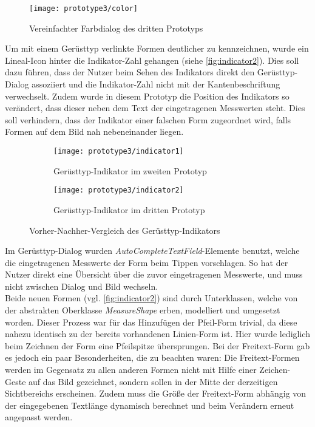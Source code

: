 \begin{figure}[h]
  \centering
  \texttt{[image: prototype3/color]}
  \caption{Vereinfachter Farbdialog des dritten Prototyps}
  \label{fig:color3}
\end{figure}

Um mit einem Gerüsttyp verlinkte Formen deutlicher zu kennzeichnen, wurde ein Lineal-Icon hinter die Indikator-Zahl gehangen (siehe \autoref{fig:indicator2}).
Dies soll dazu führen, dass der Nutzer beim Sehen des Indikators direkt den Gerüsttyp-Dialog assoziiert und die Indikator-Zahl nicht mit der Kantenbeschriftung verwechselt.
Zudem wurde in diesem Prototyp die Position des Indikators so verändert, dass dieser neben dem Text der eingetragenen Messwerten steht.
Dies soll verhindern, dass der Indikator einer falschen Form zugeordnet wird, falls Formen auf dem Bild nah nebeneinander liegen. \\

\begin{figure}[h]
  \centering
  \begin{subfigure}[t]{0.4\textwidth}
    \texttt{[image: prototype3/indicator1]}
    \caption{Gerüsttyp-Indikator im zweiten Prototyp}
    \label{fig:indicator1}
  \end{subfigure}
  \begin{subfigure}[t]{0.4\textwidth}
    \texttt{[image: prototype3/indicator2]}
    \caption{Gerüsttyp-Indikator im dritten Prototyp}
    \label{fig:indicator2}
  \end{subfigure}
  \caption{Vorher-Nachher-Vergleich des Gerüsttyp-Indikators}
  \label{fig:indicators}
\end{figure}

Im Gerüsttyp-Dialog wurden \emph{AutoCompleteTextField}-Elemente benutzt, welche die eingetragenen Messwerte der Form beim Tippen vorschlagen.
So hat der Nutzer direkt eine Übersicht über die zuvor eingetragenen Messwerte, und muss nicht zwischen Dialog und Bild wechseln. \\

Beide neuen Formen (vgl. \autoref{fig:indicator2}) sind durch Unterklassen, welche von der abstrakten Oberklasse \emph{MeasureShape} erben, modelliert und umgesetzt worden.
Dieser Prozess war für das Hinzufügen der Pfeil-Form trivial, da diese nahezu identisch zu der bereits vorhandenen Linien-Form ist.
Hier wurde lediglich beim Zeichnen der Form eine Pfeilspitze übersprungen.
Bei der Freitext-Form gab es jedoch ein paar Besonderheiten, die zu beachten waren:
Die Freitext-Formen werden im Gegensatz zu allen anderen Formen nicht mit Hilfe einer Zeichen-Geste auf das Bild gezeichnet, sondern sollen in der Mitte der derzeitigen Sichtbereichs erscheinen.
Zudem muss die Größe der Freitext-Form abhängig von der eingegebenen Textlänge dynamisch berechnet und beim Verändern erneut angepasst werden. \\

